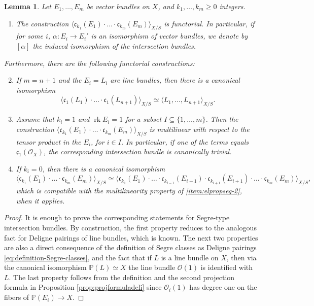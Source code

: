\documentclass[JEP,XML,SOM,Unicode,published]{cedram}
\theoremstyle{plain}
\newtheorem{lemma}[theorem]{Lemma}
\theoremstyle{definition}
\newcommand{\PBbb}{\mathbb P}
\newcommand{\Ocal}{\mathcal O}
\newcommand{\cfrak}{\mathfrak c}
\DeclareMathOperator{\rk}{rk}
\begin{document}
\begin{lemma}\label{lemma:elementary-properties-segre}
Let $E_{1},\ldots, E_{m}$ be vector bundles on $X$, and $k_{1},\ldots, k_{m}\geq 0$ integers.
\begin{enumerate}
\item\label{item:elpropsef-0} The construction $\langle \cfrak_{k_{1}}(E_{1})\cdot\ldots \cdot \cfrak_{k_{m}}(E_{m})\rangle_{X/S}$ is functorial. In particular, if for some $i$, $\alpha: E_i \to E_i'$ is an isomorphism of vector bundles, we denote by $[\alpha]$ the induced isomorphism of the intersection bundles.
\end{enumerate}
Furthermore, there are the following functorial constructions:
\begin{enumerate}
\setcounter{enumi}{1}
\item\label{item:elpropseg-1} If $m=n+1$ and the $E_{i}=L_{i}$ are line bundles, then there is a canonical isomorphism
\begin{displaymath}
\langle \cfrak_{1}(L_1)\cdot \ldots\cdot \cfrak_{1}(L_{n+1}) \rangle_{X/S}\simeq
\langle L_{1},\ldots, L_{n+1}\rangle_{X/S}.
\end{displaymath}
\item\label{item:elpropseg-2} Assume that $k_{i}=1$ and $\rk E_{i}=1$ for a subset $I\subseteq\lbrace 1,\ldots, m\rbrace$. Then the construction $\langle \cfrak_{k_1}(E_1)\cdot \ldots\cdot \cfrak_{k_{m}}(E_m) \rangle_{X/S}$ is multilinear with respect to the tensor product in the $E_{i}$, for $i\in I$. In particular, if one of the terms equals $\cfrak_1(\Ocal_X)$, the corresponding intersection bundle is canonically trivial.
\item\label{item:elpropseg-3} If $k_{i}=0$, then there is a canonical isomorphism
\begin{displaymath}
\langle \cfrak_{k_1}(E_1)\cdot \ldots\cdot \cfrak_{k_m}(E_m) \rangle_{X/S}\simeq
\langle\cfrak_{k_{1}}(E_{1})\cdot\ldots \cdot\cfrak_{k_{i-1}}(E_{i-1})\cdot\cfrak_{k_{i+1}}(E_{i+1})\cdot\ldots\cdot\cfrak_{k_{m}}(E_m)\rangle_{X/S},
\end{displaymath}
which is compatible with the multilinearity property of \eqref{item:elpropseg-2}, when it applies.
\end{enumerate}
\end{lemma}
\begin{proof}
It is enough to prove the corresponding statements for Segre-type intersection bundles. By construction, the first property reduces to the analogous fact for Deligne pairings of line bundles, which is known. The next two properties are also a direct consequence of the definition of Segre classes as Deligne pairings \eqref{eq:definition-Segre-classes}, and the fact that if $L$ is a line bundle on $X$, then via the canonical isomorphism $\PBbb(L)\simeq X$ the line bundle $\Ocal(1)$ is identified with $L$. The last property follows from the definition and the second projection formula in Proposition \ref{prop:projformuladeli} since $\Ocal_{i}(1)$ has degree one on the fibers of $\PBbb(E_{i})\to X$.
\end{proof}
\end{document}
